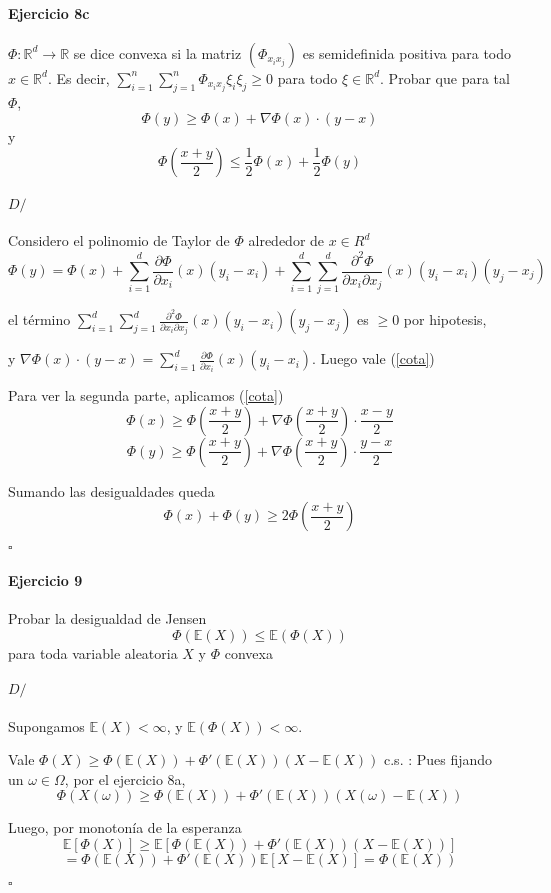 \documentclass[10pt,a4paper]{article}
\newcommand{\R}{ \mathbb R }
\newcommand{\E}{ \mathbb E }
\newenvironment{ejercicio}[3]
{
	\paragraph{Ejercicio #1}
	#2
	\paragraph{$D/$}
	#3
	\begin{flushright}$\square$\end{flushright}
}{
}
\begin{document}
\begin{ejercicio}{8c}{
	$\Phi: \R^d \to \R$	se dice convexa si la matriz $(\Phi_{x_i x_j})$ es semidefinida positiva para todo $x \in \R^d$.
	Es decir, $\sum_{i=1}^n \sum_{j=1}^n \Phi_{x_i x_j} \xi_i \xi_j \ge 0$ para todo $\xi \in \R^d$.
	Probar que para tal $\Phi$,
	\begin{equation}
	\label{cota}
		\Phi(y) \ge \Phi(x) + \nabla\Phi(x) \cdot (y-x)
	\end{equation}
	y
	$$
		\Phi(\frac{x+y}{2}) \le \frac{1}{2}\Phi(x) + \frac{1}{2}\Phi(y)
	$$
}{
	Considero el polinomio de Taylor de $\Phi$ alrededor de $x \in R^d$
	$$
		\Phi(y) = \Phi(x)
		+ \sum_{i=1}^d \frac {\partial \Phi}{\partial x_i}(x) (y_i - x_i)
		+ \sum_{i=1}^d \sum_{j=1}^d \frac{\partial^2 \Phi}{\partial x_i \partial x_j}(x) (y_i - x_i) (y_j - x_j)
	$$

	el t\'ermino $\sum_{i=1}^d \sum_{j=1}^d \frac{\partial^2 \Phi}{\partial x_i \partial x_j}(x) (y_i - x_i) (y_j - x_j)$ es $\ge 0$ por hipotesis,

	y $\nabla\Phi(x) \cdot (y-x) = \sum_{i=1}^d \frac {\partial \Phi}{\partial x_i}(x) (y_i - x_i)$.
	Luego vale (\ref{cota})

	Para ver la segunda parte, aplicamos (\ref{cota})
	$$
		\Phi(x) \ge \Phi\left(\frac{x+y}{2}\right) + \nabla\Phi\left(\frac{x+y}{2}\right) \cdot \frac{x-y}{2}
	$$
	$$
		\Phi(y) \ge \Phi\left(\frac{x+y}{2}\right) + \nabla\Phi\left(\frac{x+y}{2}\right) \cdot \frac{y-x}{2}
	$$

	Sumando las desigualdades queda
	$$
		\Phi(x) + \Phi(y) \ge 2 \Phi\left(\frac{x+y}{2}\right)
	$$
}
\end{ejercicio}

\begin{ejercicio}{9}{
	Probar la desigualdad de Jensen
	$$
		\Phi(\E(X)) \le \E(\Phi(X))
	$$
	para toda variable aleatoria $X$ y $\Phi$ convexa
}{
	Supongamos $\E(X) < \infty$, y $\E (\Phi(X)) < \infty$.

		Vale $ \Phi(X) \ge \Phi(\E(X)) + \Phi'(\E(X))(X - \E(X)) $ c.s. :
		Pues fijando un $\omega \in \Omega$, por el ejercicio 8a,
		$$
			\Phi(X(\omega))
			\ge
			\Phi(\E(X)) + \Phi'(\E(X)) (X(\omega) - \E(X))
		$$

		Luego, por monotonía de la esperanza
		$$
			\E[\Phi(X)]
			\ge
			\E[\Phi(\E(X)) + \Phi'(\E(X)) (X - \E(X))]
			$$$$
			=
			\Phi(\E(X)) + \Phi'(\E(X)) \E[X - \E(X)]
			=
			\Phi(\E(X))
		$$
}\end{ejercicio}
\end{document}
